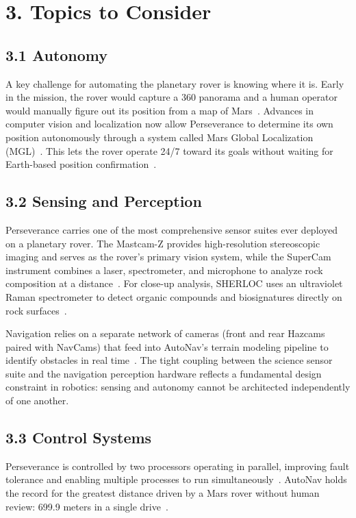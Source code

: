 \documentclass[11pt]{article}
\begin{document}
\section*{3. Topics to Consider}

\subsection*{3.1 Autonomy}
A key challenge for automating the planetary rover is knowing where it is. Early in the mission, the rover
would capture a 360\textdegree{} panorama and a human operator would manually figure out its
position from a map of Mars~\cite{mgl_universetoday}. Advances in computer vision and localization now allow
Perseverance to determine its own position autonomously through a system called Mars Global
Localization (MGL)~\cite{mgl_universetoday}. This lets the rover operate 24/7 toward its goals
without waiting for Earth-based position confirmation~\cite{autonav_jpl}. 

\subsection*{3.2 Sensing and Perception}
Perseverance carries one of the most comprehensive sensor suites ever deployed on a planetary rover.
The Mastcam-Z provides high-resolution stereoscopic imaging and serves as the rover's primary
vision system, while the SuperCam instrument combines a laser, spectrometer, and microphone to
analyze rock composition at a distance~\cite{rover_components}. For close-up analysis, SHERLOC uses an ultraviolet
Raman spectrometer to detect organic compounds and biosignatures directly on rock
surfaces~\cite{rover_components}.

Navigation relies on a separate network of cameras (front and rear Hazcams paired
with NavCams) that feed into AutoNav's terrain modeling pipeline to identify obstacles in real
time~\cite{autonav_jpl}. The tight coupling between the science sensor suite and the navigation perception
hardware reflects a fundamental design constraint in robotics: sensing and autonomy
cannot be architected independently of one another.

\subsection*{3.3 Control Systems}
Perseverance is controlled by two processors operating in parallel, improving
fault tolerance and enabling multiple processes to run simultaneously~\cite{rover_components}. AutoNav holds the record
for the greatest distance driven by a Mars rover without human review: 699.9 meters in a single
drive~\cite{autonav_jpl,science_robotics}.
\end{document}
